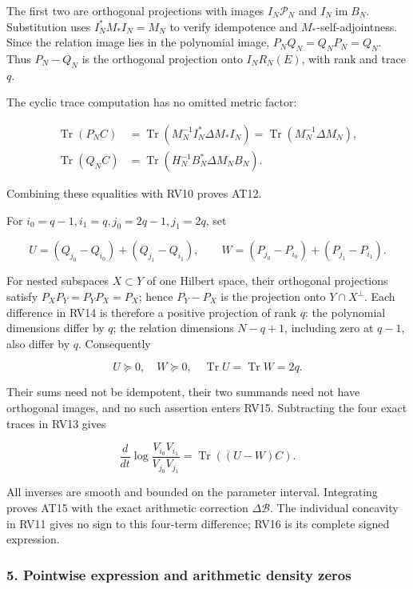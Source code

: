 The first two are orthogonal projections with images \(I_N\mathcal P_N\) and \(I_N\operatorname{im}B_N\). Substitution uses \(I_N^*M_*I_N=M_N\) to verify idempotence and \(M_*\)-self-adjointness. Since the relation image lies in the polynomial image, \(P_NQ_N=Q_NP_N=Q_N\). Thus \(P_N-Q_N\) is the orthogonal projection onto \(I_NR_N(E)\), with rank and trace \(q\).

The cyclic trace computation has no omitted metric factor:

\[
\begin{aligned}
\operatorname{Tr}(P_NC)
&=\operatorname{Tr}(M_N^{-1}I_N^*\Delta M_*I_N)
=\operatorname{Tr}(M_N^{-1}\Delta M_N),\\
\operatorname{Tr}(Q_NC)
&=\operatorname{Tr}(H_N^{-1}B_N^*\Delta M_NB_N).
\end{aligned}
\tag{RV13}
\]

Combining these equalities with RV10 proves AT12.

For \(i_0=q-1,i_1=q,j_0=2q-1,j_1=2q\), set

\[
U=(Q_{j_0}-Q_{i_0})+(Q_{j_1}-Q_{i_1}),\qquad
W=(P_{j_0}-P_{i_0})+(P_{j_1}-P_{i_1}).
\tag{RV14}
\]

For nested subspaces \(X\subset Y\) of one Hilbert space, their orthogonal projections satisfy \(P_XP_Y=P_YP_X=P_X\); hence \(P_Y-P_X\) is the projection onto \(Y\cap X^\perp\). Each difference in RV14 is therefore a positive projection of rank \(q\): the polynomial dimensions differ by \(q\); the relation dimensions \(N-q+1\), including zero at \(q-1\), also differ by \(q\). Consequently

\[
U\succeq0,\quad W\succeq0,\quad
\operatorname{Tr}U=\operatorname{Tr}W=2q.
\tag{RV15}
\]

Their sums need not be idempotent, their two summands need not have orthogonal images, and no such assertion enters RV15. Subtracting the four exact traces in RV13 gives

\[
\frac d{dt}\log\frac{V_{i_0}V_{i_1}}{V_{j_0}V_{j_1}}
=\operatorname{Tr}((U-W)C).
\tag{RV16}
\]

All inverses are smooth and bounded on the parameter interval. Integrating proves AT15 with the exact arithmetic correction \(\Delta\mathcal B\). The individual concavity in RV11 gives no sign to this four-term difference; RV16 is its complete signed expression.

\subsubsection{5. Pointwise expression and arithmetic density zeros}\label{endpoint-determinant_review--pointwise-expression-and-arithmetic-density-zeros}

